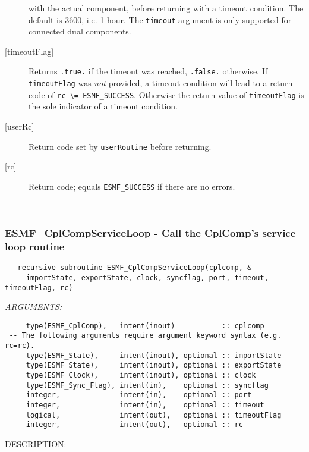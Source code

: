 \begin{description}
     with the actual component, before returning with a timeout condition.
     The default is 3600, i.e. 1 hour. The {\tt timeout} argument is only
     supported for connected dual components.
   \item[{[timeoutFlag]}]
     Returns {\tt .true.} if the timeout was reached, {\tt .false.} otherwise.
     If {\tt timeoutFlag} was {\em not} provided, a timeout condition will lead
     to a return code of {\tt rc \textbackslash = ESMF\_SUCCESS}. Otherwise the
     return value of {\tt timeoutFlag} is the sole indicator of a timeout
     condition.
   \item[{[userRc]}]
     Return code set by {\tt userRoutine} before returning.
   \item[{[rc]}]
     Return code; equals {\tt ESMF\_SUCCESS} if there are no errors.
   \end{description}
   
 
\mbox{}\hrulefill\ 
 
\subsubsection [ESMF\_CplCompServiceLoop] {ESMF\_CplCompServiceLoop - Call the CplComp's service loop routine}


 
\begin{verbatim}   recursive subroutine ESMF_CplCompServiceLoop(cplcomp, &
     importState, exportState, clock, syncflag, port, timeout, timeoutFlag, rc)\end{verbatim}{\em ARGUMENTS:}
\begin{verbatim}     type(ESMF_CplComp),   intent(inout)           :: cplcomp
 -- The following arguments require argument keyword syntax (e.g. rc=rc). --
     type(ESMF_State),     intent(inout), optional :: importState
     type(ESMF_State),     intent(inout), optional :: exportState
     type(ESMF_Clock),     intent(inout), optional :: clock
     type(ESMF_Sync_Flag), intent(in),    optional :: syncflag
     integer,              intent(in),    optional :: port
     integer,              intent(in),    optional :: timeout
     logical,              intent(out),   optional :: timeoutFlag
     integer,              intent(out),   optional :: rc\end{verbatim}
{\sf DESCRIPTION:\\ }


